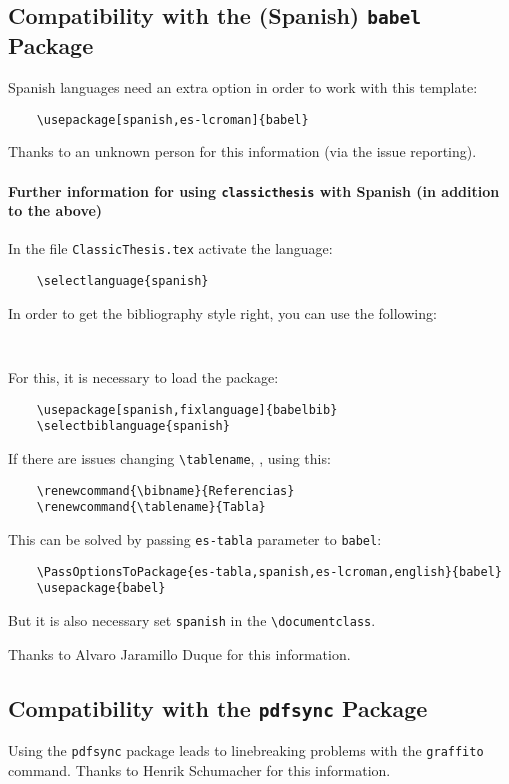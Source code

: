 \subsection*{Compatibility with the (Spanish) \texttt{babel} Package}
Spanish languages need an extra option in order to work with this template:
\begin{verbatim}
	\usepackage[spanish,es-lcroman]{babel}
\end{verbatim}
Thanks to an unknown person for this information (via the issue reporting). 


\paragraph{Further information for using \texttt{classicthesis} with Spanish (in addition to the above)}
In the file \texttt{ClassicThesis.tex} activate the language: 
\begin{verbatim}
	\selectlanguage{spanish}
\end{verbatim}
	
In order to get the bibliography style right, you can use the following:
\begin{verbatim}
	
\end{verbatim}

For this, it is necessary to load the package:
\begin{verbatim}
	\usepackage[spanish,fixlanguage]{babelbib}
	\selectbiblanguage{spanish}
\end{verbatim}

If there are issues changing \verb|\tablename|, \eg, using this:
\begin{verbatim}
	\renewcommand{\bibname}{Referencias}
	\renewcommand{\tablename}{Tabla}
\end{verbatim}

This can be solved by passing \texttt{es-tabla} parameter to \texttt{babel}:
\begin{verbatim}
	\PassOptionsToPackage{es-tabla,spanish,es-lcroman,english}{babel}
	\usepackage{babel}
\end{verbatim}

But it is also necessary set \texttt{spanish} in the \verb|\documentclass|.

Thanks to Alvaro Jaramillo Duque for this information. 


\subsection*{Compatibility with the \texttt{pdfsync} Package}
Using the \texttt{pdfsync} package leads to linebreaking problems with the \texttt{graffito} command. 
Thanks to Henrik Schumacher for this information. 



